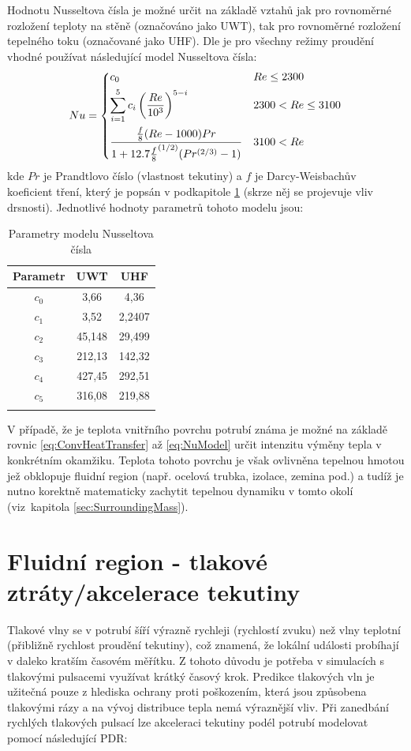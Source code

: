Hodnotu Nusseltova čísla je možné určit na základě vztahů jak pro rovnoměrné
rozložení teploty na stěně (označováno jako UWT), tak pro rovnoměrné rozložení
tepelného toku (označované jako UHF). Dle \cite{Abraham2009} je pro všechny
režimy proudění vhodné používat následující model Nusseltova čísla:
\begin{equation}
\label{eq:NuModel}
  Nu =
  \begin{dcases}
    c_0 & Re\leq 2300 \\
    \sum_{i=1}^{5} c_i\left(\frac{Re}{10^3}\right)^{5-i} & 2300 < Re\le 3100 \\
    \frac{\frac{f}{8}(Re-1000)Pr}
    {1+12.7{\frac{f}{8}}^{(1/2)}(Pr^{(2/3)}-1)} & 3100 < Re
  \end{dcases}
\end{equation}
kde \(Pr\) je Prandtlovo číslo (vlastnost tekutiny) a \(f\) je Darcy-Weisbachův
koeficient tření, který je popsán v podkapitole \ref{sec:PressureLoss} (skrze
něj se projevuje vliv drsnosti). Jednotlivé hodnoty parametrů tohoto modelu
jsou:
\begin{table}[H]
  \label{tab:NuModel}
  \caption{Parametry modelu Nusseltova čísla}
  \vskip6pt
  \centering
  \begin{tabular}{ccc}
    \toprule
    Parametr & UWT & UHF \\ [0.5ex]
    \hline
    \(c_0\) & 3,66 & 4,36 \\
    \(c_1\) & 3,52 & 2,2407 \\
    \(c_2\) & 45,148 & 29,499 \\
    \(c_3\) & 212,13 & 142,32 \\
    \(c_4\) & 427,45 & 292,51 \\
    \(c_5\) & 316,08 & 219,88 \\
    \bottomrule \\[0.1mm]
  \end{tabular}
\end{table}
V případě, že je teplota vnitřního povrchu potrubí známa je možné na základě
rovnic \ref{eq:ConvHeatTransfer} až \ref{eq:NuModel} určit intenzitu výměny
tepla v konkrétním okamžiku. Teplota tohoto povrchu je však ovlivněna tepelnou
hmotou jež obklopuje fluidní region (např. ocelová trubka, izolace, zemina
pod.) a tudíž je nutno korektně matematicky zachytit tepelnou dynamiku v tomto
okolí (viz~kapitola \ref{sec:SurroundingMass}).

\section{Fluidní region - tlakové ztráty/akcelerace tekutiny}
\label{sec:PressureLoss}
Tlakové vlny se v potrubí šíří výrazně rychleji (rychlostí zvuku) než vlny
teplotní (přibližně rychlost proudění tekutiny), což znamená, že lokální
události probíhají v daleko kratším časovém měřítku. Z tohoto důvodu je potřeba
v simulacích s tlakovými pulsacemi využívat krátký časový krok. Predikce
tlakových vln je užitečná pouze z hlediska ochrany proti poškozením, která
jsou způsobena tlakovými rázy a na vývoj distribuce tepla nemá výraznější vliv.
Při zanedbání rychlých tlakových pulsací lze akceleraci tekutiny podél potrubí
modelovat pomocí následující PDR:

